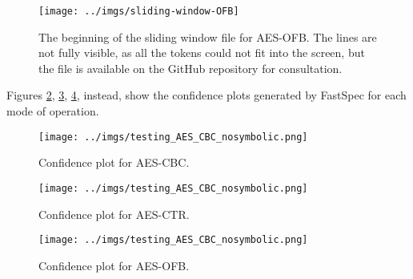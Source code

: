 \documentclass[12pt,a4paper]{book}
\theoremstyle{definition}
\begin{document}
	\begin{figure}
		\centering
		\texttt{[image: ../imgs/sliding-window-OFB]}
		\caption{The beginning of the sliding window file for AES-OFB. The lines are not fully visible, as all the tokens could not fit into the screen, but the file is available on the GitHub repository for consultation.}
		\label{fig:sliding-wnd}
	\end{figure}
	
	Figures \ref{fig:conf-cbc}, \ref{fig:conf-ctr}, \ref{fig:conf-ofb}, instead, show the confidence plots generated by FastSpec for each mode of operation. 
	\begin{comment}
		
		\begin{figure}
			\begin{subfigure}
				\texttt{[image: ../imgs/testing\_AES\_CBC\_nosymbolic.png]}
				\caption{Confidence plot for AES-CBC.}
				\label{fig:conf-cbc}
			\end{subfigure}%
			\begin{subfigure}
				\texttt{[image: ../imgs/testing\_AES\_CBC\_nosymbolic.png]}
				\caption{Confidence plot for AES-CTR.}
				\label{fig:conf-ctr}
			\end{subfigure}%
			\begin{subfigure}
				\texttt{[image: ../imgs/testing\_AES\_CBC\_nosymbolic.png]}
				\caption{Confidence plot for AES-OFB.}
				\label{fig:conf-ofb}
			\end{subfigure}
		\end{figure}
		
	\end{comment}
	
	\begin{figure}
		\hspace*{-2.7cm}
		\texttt{[image: ../imgs/testing\_AES\_CBC\_nosymbolic.png]}
		\caption{Confidence plot for AES-CBC.}
		\label{fig:conf-cbc}
	\end{figure}
	
	\begin{figure}
		\hspace*{-2.7cm}
		\texttt{[image: ../imgs/testing\_AES\_CBC\_nosymbolic.png]}
		\caption{Confidence plot for AES-CTR.}
		\label{fig:conf-ctr}		
	\end{figure}
	
	\begin{figure}
		\hspace*{-2.7cm}
		\texttt{[image: ../imgs/testing\_AES\_CBC\_nosymbolic.png]}
		\caption{Confidence plot for AES-OFB.}
		\label{fig:conf-ofb}
	\end{figure}
	
\end{document}
